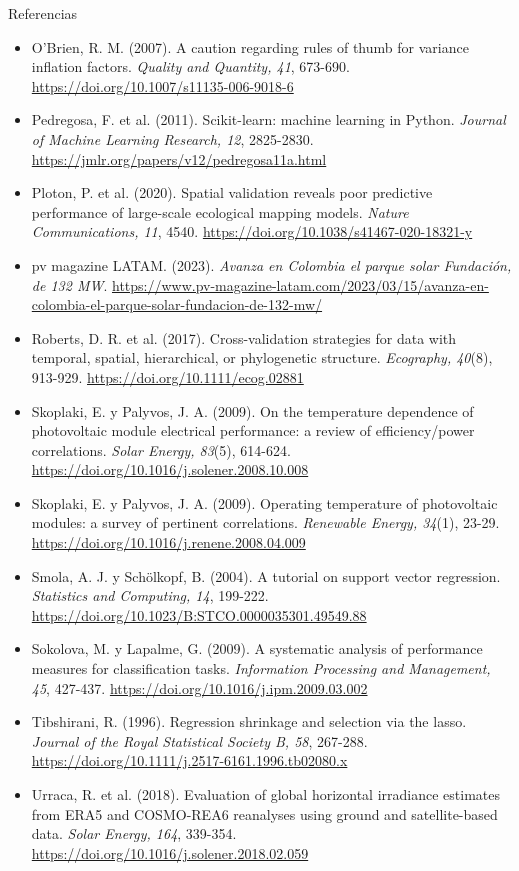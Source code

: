 \documentclass[aspectratio=169,10pt]{beamer}
\begin{document}
\begin{frame}[allowframebreaks]{Referencias}
\begin{itemize}
    \item O'Brien, R. M. (2007). A caution regarding rules of thumb for variance inflation factors. \textit{Quality and Quantity, 41}, 673-690. \url{https://doi.org/10.1007/s11135-006-9018-6}
    \item Pedregosa, F. et al. (2011). Scikit-learn: machine learning in Python. \textit{Journal of Machine Learning Research, 12}, 2825-2830. \url{https://jmlr.org/papers/v12/pedregosa11a.html}
    \item Ploton, P. et al. (2020). Spatial validation reveals poor predictive performance of large-scale ecological mapping models. \textit{Nature Communications, 11}, 4540. \url{https://doi.org/10.1038/s41467-020-18321-y}
    \item pv magazine LATAM. (2023). \textit{Avanza en Colombia el parque solar Fundación, de 132 MW}. \url{https://www.pv-magazine-latam.com/2023/03/15/avanza-en-colombia-el-parque-solar-fundacion-de-132-mw/}
    \item Roberts, D. R. et al. (2017). Cross-validation strategies for data with temporal, spatial, hierarchical, or phylogenetic structure. \textit{Ecography, 40}(8), 913-929. \url{https://doi.org/10.1111/ecog.02881}
    \item Skoplaki, E. y Palyvos, J. A. (2009). On the temperature dependence of photovoltaic module electrical performance: a review of efficiency/power correlations. \textit{Solar Energy, 83}(5), 614-624. \url{https://doi.org/10.1016/j.solener.2008.10.008}
    \item Skoplaki, E. y Palyvos, J. A. (2009). Operating temperature of photovoltaic modules: a survey of pertinent correlations. \textit{Renewable Energy, 34}(1), 23-29. \url{https://doi.org/10.1016/j.renene.2008.04.009}
    \item Smola, A. J. y Schölkopf, B. (2004). A tutorial on support vector regression. \textit{Statistics and Computing, 14}, 199-222. \url{https://doi.org/10.1023/B:STCO.0000035301.49549.88}
    \item Sokolova, M. y Lapalme, G. (2009). A systematic analysis of performance measures for classification tasks. \textit{Information Processing and Management, 45}, 427-437. \url{https://doi.org/10.1016/j.ipm.2009.03.002}
    \item Tibshirani, R. (1996). Regression shrinkage and selection via the lasso. \textit{Journal of the Royal Statistical Society B, 58}, 267-288. \url{https://doi.org/10.1111/j.2517-6161.1996.tb02080.x}
    \item Urraca, R. et al. (2018). Evaluation of global horizontal irradiance estimates from ERA5 and COSMO-REA6 reanalyses using ground and satellite-based data. \textit{Solar Energy, 164}, 339-354. \url{https://doi.org/10.1016/j.solener.2018.02.059}

\end{itemize}
\end{frame}
\end{document}
